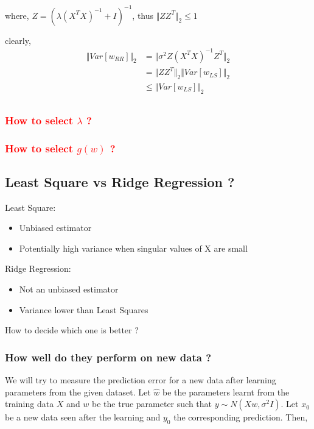 \documentclass{article}
\newcommand{\red}[1]{\textcolor{red}{#1}}
\newcommand{\newpara}{\leavevmode\newline}
\begin{document}
where, $Z = (\lambda (X^TX)^{-1} + I)^{-1}$, thus $\Vert ZZ^T \Vert_2 \leq 1$

clearly,
\begin{align*}
    \Vert Var[w_{RR}] \Vert_2 &= \Vert \sigma^2 Z (X^T X)^{-1} Z^T \Vert_2\\
    & = \Vert ZZ^T \Vert_2 \Vert Var[w_{LS}] \Vert_2\\
    & \leq \Vert Var[w_{LS}] \Vert_2\\
\end{align*}

\subsubsection{\red{How to select $\lambda$ ?}}
\subsubsection{\red{How to select $g(w)$ ?}}


\subsection{Least Square vs Ridge Regression ?}

Least Square:
\begin{itemize}
    \item Unbiased estimator
    \item Potentially high variance when singular values of X are small
\end{itemize}
\newpara
Ridge Regression:
\begin{itemize}
    \item Not an unbiased estimator
    \item Variance lower than Least Squares
\end{itemize}
\newpara
How to decide which one is better ?

\subsubsection{How well do they perform on new data ?}
We will try to measure the prediction error for a new data after learning parameters from the given dataset. Let $\hat{w}$ be the parameters learnt from the training data $X$ and $w$ be the true parameter such that $y \sim N(Xw, \sigma^2I)$. Let $x_0$ be a new data seen after the learning and $y_0$ the corresponding prediction. Then,
\end{document}
